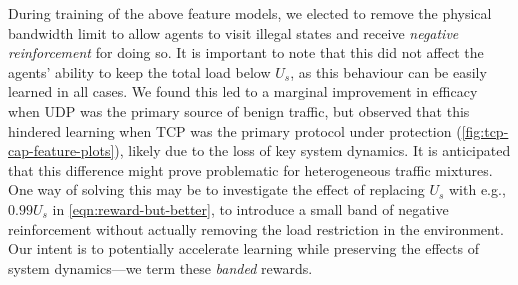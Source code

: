 \documentclass[conference, letterpaper, 10pt, times]{IEEEtran}
\begin{document}
During training of the above feature models, we elected to remove the physical bandwidth limit to allow agents to visit illegal states and receive \emph{negative reinforcement} for doing so.
It is important to note that this did not affect the agents' ability to keep the total load below $U_s$, as this behaviour can be easily learned in all cases.
We found this led to a marginal improvement in efficacy when UDP was the primary source of benign traffic, but observed that this hindered learning when TCP was the primary protocol under protection (\cref{fig:tcp-cap-feature-plots}), likely due to the loss of key system dynamics.
It is anticipated that this difference might prove problematic for heterogeneous traffic mixtures.
One way of solving this may be to investigate the effect of replacing $U_s$ with e.g., $0.99 U_s$ in \cref{eqn:reward-but-better}, to introduce a small band of negative reinforcement without actually removing the load restriction in the environment.
Our intent is to potentially accelerate learning while preserving the effects of system dynamics---we term these \emph{banded} rewards.




\end{document}

